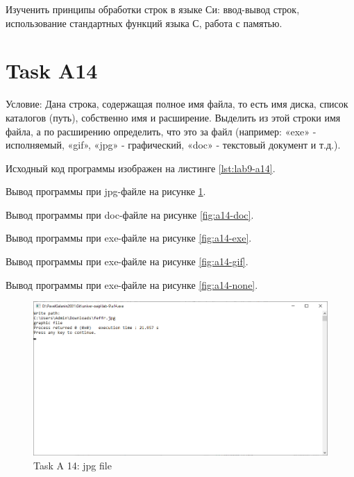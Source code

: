 \documentclass[12pt,a4paper]{article}
\begin{document}
\maketitle



\labheading



\begin{labgoal}
Изученить принципы обработки строк в языке Си: ввод-вывод строк, использование стандартных функций языка С, работа с памятью.
\end{labgoal}



\labreport

\section{Task A14}

\begin{conductionA14}
Условие: Дана строка, содержащая полное имя файла, то есть имя диска, список
каталогов (путь), собственно имя и расширение. Выделить из этой строки имя
файла, а по расширению определить, что это за файл (например: «exe» -
исполняемый, «gif», «jpg» - графический, «doc» - текстовый документ и т.д.).
\end{conductionA14}

Исходный код программы изображен на листинге \ref{lst:lab9-a14}.

Вывод программы при jpg-файле на рисунке \ref{fig:a14-jpg}.

Вывод программы при doc-файле на рисунке \ref{fig:a14-doc}.

Вывод программы при exe-файле на рисунке \ref{fig:a14-exe}.

Вывод программы при exe-файле на рисунке \ref{fig:a14-gif}.

Вывод программы при exe-файле на рисунке \ref{fig:a14-none}.



\begin{figure}[ht]
  \centering
  \includegraphics[width=16cm]{imgs/a14jpg.png}
  \caption{Task A 14: jpg file}
  \label{fig:a14-jpg}
\end{figure}
\end{document}
